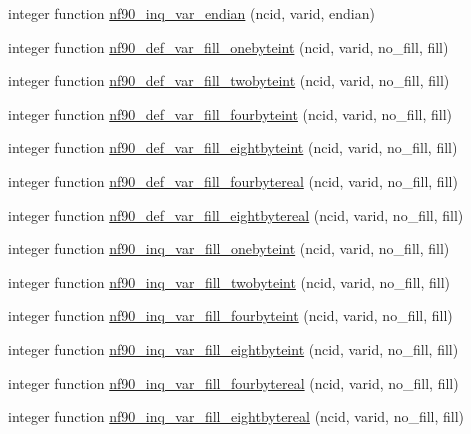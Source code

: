 \begin{DoxyCompactItemize}
integer function \hyperlink{netcdf4__func_8f90_a0031d4f4ca98a518426a5347fa429c6f}{nf90\+\_\+inq\+\_\+var\+\_\+endian} (ncid, varid, endian)
\item 
integer function \hyperlink{netcdf4__func_8f90_a76c26f620408ebc5943bf6430e0a02fc}{nf90\+\_\+def\+\_\+var\+\_\+fill\+\_\+onebyteint} (ncid, varid, no\+\_\+fill, fill)
\item 
integer function \hyperlink{netcdf4__func_8f90_adab444302dc4463b369982de72f43d86}{nf90\+\_\+def\+\_\+var\+\_\+fill\+\_\+twobyteint} (ncid, varid, no\+\_\+fill, fill)
\item 
integer function \hyperlink{netcdf4__func_8f90_a889ae889df8027ac63ac9fbe0099ac93}{nf90\+\_\+def\+\_\+var\+\_\+fill\+\_\+fourbyteint} (ncid, varid, no\+\_\+fill, fill)
\item 
integer function \hyperlink{netcdf4__func_8f90_ac21f174cc8607071ffb854c2920894a6}{nf90\+\_\+def\+\_\+var\+\_\+fill\+\_\+eightbyteint} (ncid, varid, no\+\_\+fill, fill)
\item 
integer function \hyperlink{netcdf4__func_8f90_ad7f5ad944842ad43b2491db687804b85}{nf90\+\_\+def\+\_\+var\+\_\+fill\+\_\+fourbytereal} (ncid, varid, no\+\_\+fill, fill)
\item 
integer function \hyperlink{netcdf4__func_8f90_adf5a715c6c4eef95d806824e07bd2e86}{nf90\+\_\+def\+\_\+var\+\_\+fill\+\_\+eightbytereal} (ncid, varid, no\+\_\+fill, fill)
\item 
integer function \hyperlink{netcdf4__func_8f90_a5a539dd54d111550f67c380b341689d2}{nf90\+\_\+inq\+\_\+var\+\_\+fill\+\_\+onebyteint} (ncid, varid, no\+\_\+fill, fill)
\item 
integer function \hyperlink{netcdf4__func_8f90_ab03aea4c23255011b0987cd78681eae9}{nf90\+\_\+inq\+\_\+var\+\_\+fill\+\_\+twobyteint} (ncid, varid, no\+\_\+fill, fill)
\item 
integer function \hyperlink{netcdf4__func_8f90_a78fc23edbe2513932eb29398db0799cd}{nf90\+\_\+inq\+\_\+var\+\_\+fill\+\_\+fourbyteint} (ncid, varid, no\+\_\+fill, fill)
\item 
integer function \hyperlink{netcdf4__func_8f90_af257754d3706216ec0edcd01e65435a9}{nf90\+\_\+inq\+\_\+var\+\_\+fill\+\_\+eightbyteint} (ncid, varid, no\+\_\+fill, fill)
\item 
integer function \hyperlink{netcdf4__func_8f90_a8afc8107388774b13823583c8940a301}{nf90\+\_\+inq\+\_\+var\+\_\+fill\+\_\+fourbytereal} (ncid, varid, no\+\_\+fill, fill)
\item 
integer function \hyperlink{netcdf4__func_8f90_a618852b8c0460f36c938fc79c762121c}{nf90\+\_\+inq\+\_\+var\+\_\+fill\+\_\+eightbytereal} (ncid, varid, no\+\_\+fill, fill)

\end{DoxyCompactItemize}
